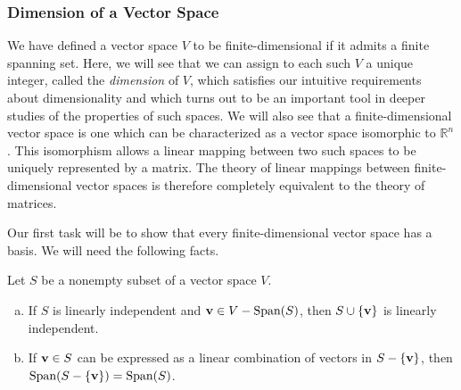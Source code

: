 \documentclass[12pt,letterpaper,reqno]{article}
\numberwithin{equation}{section}
\begin{document}
\subsubsection{Dimension of a Vector Space}
We have defined a vector space $V$ to be finite-dimensional if it admits a finite spanning set. Here, we will see that we can assign to each such $V$ a unique integer, called the \emph{dimension} of $V$, which satisfies our intuitive requirements about dimensionality and which turns out to be an important tool in deeper studies of the properties of such spaces. We will also see that a finite-dimensional vector space is one which can be characterized as a vector space isomorphic to $\mathbb{R}^n$. This isomorphism allows a linear mapping between two such spaces to be uniquely represented by a matrix. The theory of linear mappings between finite-dimensional vector spaces is therefore completely equivalent to the theory of matrices.

Our first task will be to show that every finite-dimensional vector space has a basis. We will need the following facts.
\begin{lem}\label{lem:plus_minus} Let $S$ be a nonempty subset of a vector space $V$.
\begin{enumerate}[(a)]
	\item If $S$ is linearly independent and ${\bf v}\in V-\text{Span}(S)$, then $S\cup \{{\bf v}\}$ is linearly independent.
	\item If ${\bf v} \in S$ can be expressed as a linear combination of vectors in $S-\{ {\bf v}\}$, then $\text{Span}(S-\{ {\bf v}\})=\text{Span}(S)$.
\end{enumerate}
\end{lem}
\end{document}
